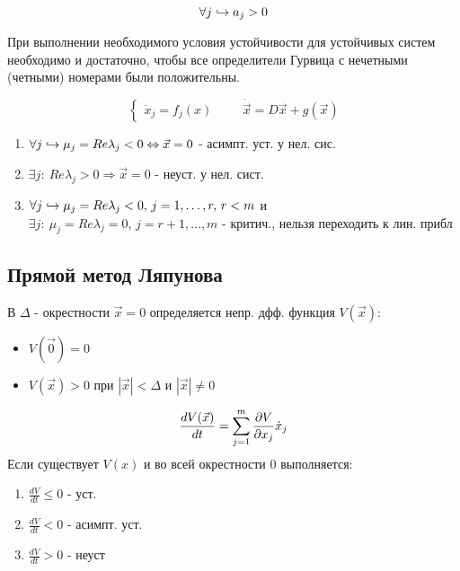\documentclass{article}
\begin{document}
\begin{theorem}
  \[
    \forall j \hookrightarrow a_j > 0
  \]
\end{theorem}
\begin{theorem}
  При выполнении необходимого условия устойчивости для устойчивых систем
  необходимо и достаточно, чтобы все определители Гурвица с нечетными (четными)
  номерами были положительны.
\end{theorem}
\begin{theorem}
  \[
    \left\{\begin{aligned}
      \dot{x}_j=f_j(x)
    \end{aligned}\right. \qquad \dot{\vec{x}}=D\vec{x}+g(\vec{x})
  \]
  \begin{enumerate}
    \item $\forall j \hookrightarrow \mu_j=Re \lambda_j<0 \Leftrightarrow \vec{x}=0$ - асимпт. уст. у нел. сис.
    \item $\exists j: \: Re\lambda_j>0 \Rightarrow \vec{x}=0$ - неуст. у нел. сист.
    \item $\forall j \hookrightarrow \mu_j=Re \lambda_j <0, \, j=1,\dots ,r, \, r<m$ и
      $\exists j: \: \mu_j=Re \lambda_j=0, \, j=r+1,\dots ,m$ 
      - критич., нельзя переходить к лин. прибл
  \end{enumerate}
\end{theorem}
\subsection{Прямой метод Ляпунова}
В $\Delta$ - окрестности $\vec{x}=0$ определяется непр. дфф. функция $V(\vec{x})$:
\begin{itemize}
  \item $V(\vec{0})=0$
  \item $V(\vec{x})>0$ при $|\vec{x}|<\Delta$ и $|\vec{x}|\neq 0$
\end{itemize}
\[
  \frac{dV(\vec{x})}{dt}=\sum_{j=1}^{m}\frac{\partial{V}}{\partial{x_j}}\dot{x}_j
\]
Если существует $V(x)$ и во всей окрестности $0$ выполняется:
\begin{enumerate}
  \item $\frac{dV}{dt}\le 0$ - уст.
  \item $\frac{dV}{dt}<0$ - асимпт. уст.
  \item $\frac{dV}{dt}>0$ - неуст
\end{enumerate}

\end{document}
